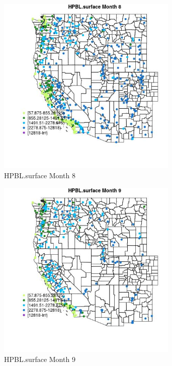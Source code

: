 \begin{figure} 
\centering  
\includegraphics[width=0.77\textwidth]{Code_Outputs/Report_ML_input_PM25_Step4_part_e_de_duplicated_aves_compiled_2019-05-18wNAs_MapObsMo8HPBLsurface.jpg} 
\caption{\label{fig:Report_ML_input_PM25_Step4_part_e_de_duplicated_aves_compiled_2019-05-18wNAsMapObsMo8HPBLsurface}HPBL.surface Month 8} 
\end{figure} 
 

\clearpage 

\begin{figure} 
\centering  
\includegraphics[width=0.77\textwidth]{Code_Outputs/Report_ML_input_PM25_Step4_part_e_de_duplicated_aves_compiled_2019-05-18wNAs_MapObsMo9HPBLsurface.jpg} 
\caption{\label{fig:Report_ML_input_PM25_Step4_part_e_de_duplicated_aves_compiled_2019-05-18wNAsMapObsMo9HPBLsurface}HPBL.surface Month 9} 
\end{figure} 
 

